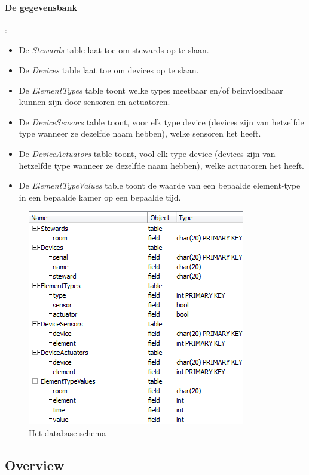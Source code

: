 \documentclass{article}
\begin{document}
\paragraph{De gegevensbank} :

\begin{itemize}
	\item De \emph{Stewards} table laat toe om stewards op te slaan.
	\item De \emph{Devices} table laat toe om devices op te slaan.
	\item De \emph{ElementTypes} table toont welke types meetbaar en/of beinvloedbaar kunnen zijn door sensoren en actuatoren.
	\item De \emph{DeviceSensors} table toont, voor elk type device (devices zijn van hetzelfde type wanneer ze dezelfde naam hebben), welke sensoren het heeft.
	\item De \emph{DeviceActuators} table toont, vool elk type device (devices zijn van hetzelfde type wanneer ze dezelfde naam hebben), welke actuatoren het heeft.
	\item De \emph{ElementTypeValues} table toont de waarde van een bepaalde element-type in een bepaalde kamer op een bepaalde tijd.
\end{itemize}

\newpage

\begin{figure}[hb]
	\begin{center}
		\includegraphics{database.png}
	\end{center}
	\caption{Het database schema}
\end{figure}

\subsection{Overview}
\end{document}
